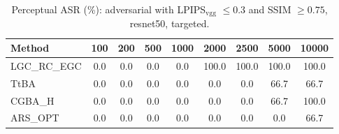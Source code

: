 \begin{table}[t]
\centering\footnotesize
\caption{Perceptual ASR (\%): adversarial with LPIPS$_{\mathrm{vgg}}$ $\le 0.3$ and SSIM $\ge 0.75$, resnet50, targeted.}
\begin{tabular}{lcccccccc}
\toprule
Method & 100 & 200 & 500 & 1000 & 2000 & 2500 & 5000 & 10000 \\
\midrule
LGC\_RC\_EGC & 0.0 & 0.0 & 0.0 & 0.0 & 100.0 & 100.0 & 100.0 & 100.0 \\
TtBA & 0.0 & 0.0 & 0.0 & 0.0 & 0.0 & 0.0 & 66.7 & 66.7 \\
CGBA\_H & 0.0 & 0.0 & 0.0 & 0.0 & 0.0 & 0.0 & 66.7 & 100.0 \\
ARS\_OPT & 0.0 & 0.0 & 0.0 & 0.0 & 0.0 & 0.0 & 0.0 & 66.7 \\
\bottomrule
\end{tabular}
\end{table}
